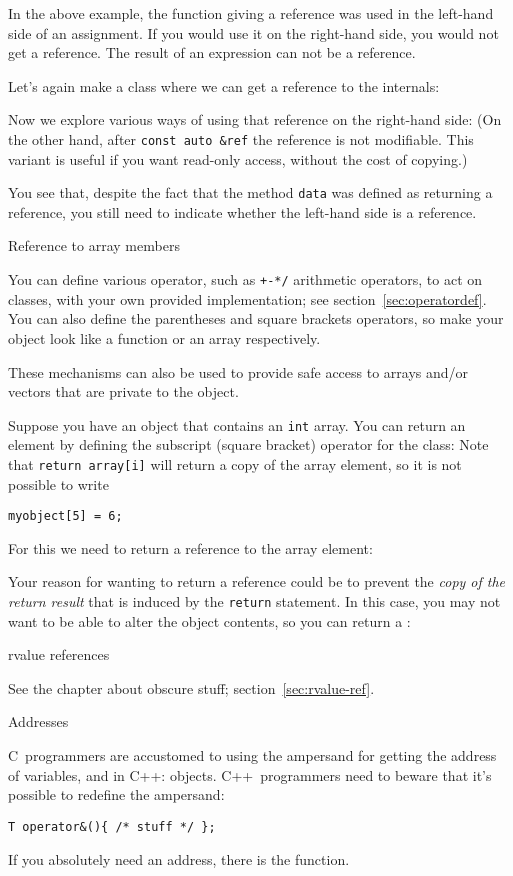 In the above example, the function giving a reference was used in the left-hand side of
an assignment. If you would use it on the right-hand side, you would
not get a reference. The result of an expression can not be a
reference.

Let's again make a class where we can get a reference to the
internals:
%

Now we explore various ways of using that reference on the right-hand
side:
%
%
(On the other hand, after \lstinline+const auto &ref+ the reference is not
modifiable. This variant is useful if you want read-only access,
without the cost of copying.)

You see that, despite the fact that the method \lstinline{data} was defined as
returning a reference, you still need to indicate whether the
left-hand side is a reference.

 {Reference to array members}
\label{sec:overloadbracket}

You can define various operator, such as \verb.+-*/. arithmetic
operators, to act on classes, with your own provided implementation;
see section~\ref{sec:operatordef}. You can also define the parentheses
and square brackets operators, so make your object look like a
function or an array respectively.

These mechanisms can also be used to provide safe access to arrays
and/or vectors that are private to the object.

Suppose you have an object that contains an \lstinline{int} array. You can
return an element by defining the subscript (square bracket) operator
for the class:
%
%
Note that \lstinline+return array[i]+ will return a copy of the array element,
so it is not possible to write
\begin{lstlisting}
myobject[5] = 6;
\end{lstlisting}
For this we need to return a reference to the array element:
%

Your reason for wanting to return a reference could be to prevent the
\emph{copy of the return result}
that is induced by the \lstinline{return} statement.
In this case, you may not want to be able to alter the object
contents, so you can return a :
%

 {rvalue references}

See the chapter about obscure stuff; section~\ref{sec:rvalue-ref}.

 {Addresses}

C~programmers are accustomed to using the ampersand for getting the address of
variables, and in C++: objects.
C++~programmers need to beware that it's possible to redefine the ampersand:
\begin{lstlisting}
T operator&(){ /* stuff */ };
\end{lstlisting}
If you absolutely need an address, there is the  function.

